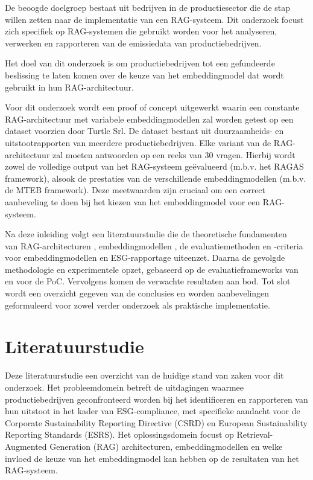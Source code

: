 De beoogde doelgroep bestaat uit bedrijven in de productiesector die de stap willen zetten naar de implementatie van een RAG-systeem. Dit onderzoek focust zich specifiek op RAG-systemen die gebruikt worden voor het analyseren, verwerken en rapporteren van de emissiedata van productiebedrijven. 

Het doel van dit onderzoek is om productiebedrijven tot een gefundeerde beslissing te laten komen over de keuze van het embeddingmodel dat wordt gebruikt in hun RAG-architectuur. 

Voor dit onderzoek wordt een proof of concept uitgewerkt waarin een constante RAG-architectuur met variabele embeddingmodellen zal worden getest op een dataset voorzien door Turtle Srl. De dataset bestaat uit duurzaamheids- en uitstootrapporten van meerdere productiebedrijven. Elke variant van de RAG-architectuur zal moeten antwoorden op een reeks van 30 vragen. Hierbij wordt zowel de volledige output van het RAG-systeem ge\"evalueerd (m.b.v. het RAGAS framework), alsook de prestaties van de verschillende embeddingmodellen (m.b.v. de MTEB framework). Deze meetwaarden zijn cruciaal om een correct aanbeveling te doen bij het kiezen van het embeddingmodel voor een RAG-systeem.

Na deze inleiding volgt een literatuurstudie die de theoretische fundamenten\\van RAG-architecturen \textcite{Lewis2020}, embeddingmodellen \textcite{Muennighoff2022} \textcite{Chen2024}, de evaluatiemethoden en -criteria voor embeddingmodellen en ESG-rapportage \autocite{GGP2013} uiteenzet. Daarna de gevolgde methodologie en experimentele opzet, gebaseerd op de evaluatieframeworks van \autocite{Es2024} en \autocite{Muennighoff2022} voor de PoC. Vervolgens komen de verwachte resultaten aan bod. Tot slot wordt een overzicht gegeven van de conclusies en worden aanbevelingen geformuleerd voor zowel verder onderzoek als praktische implementatie.


\section{Literatuurstudie}
\label{sec:literatuurstudie}

Deze literatuurstudie een overzicht van de huidige stand van zaken voor dit onderzoek. Het probleemdomein betreft de uitdagingen waarmee productiebedrijven geconfronteerd worden bij het identificeren en rapporteren van hun uitstoot in het kader van ESG-compliance, met specifieke aandacht voor de Corporate Sustainability Reporting Directive (CSRD) en European Sustainability Reporting Standards (ESRS). Het oplossingsdomein focust op Retrieval-Augmented Generation (RAG) architecturen, embeddingmodellen en welke invloed de keuze van het embeddingmodel kan hebben op de resultaten van het RAG-systeem.

